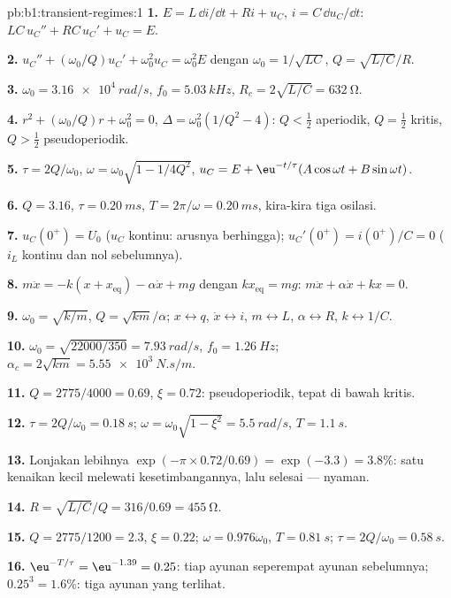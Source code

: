 \begin{solution}{pb:b1:transient-regimes:1}
\textbf{1.} $E = L\,\dd i/\dd t + Ri + u_C$, $i = C\,\dd u_C/\dd t$:
$LC\,u_C'' + RC\,u_C' + u_C = E$.

\textbf{2.} $u_C'' + (\omega_0/Q)u_C' + \omega_0^2u_C = \omega_0^2E$ dengan
$\omega_0 = 1/\sqrt{LC}$, $Q = \sqrt{L/C}/R$.

\textbf{3.} $\omega_0 = \qty{3.16e4}{rad/s}$, $f_0 = \qty{5.03}{kHz}$,
$R_c = 2\sqrt{L/C} = \qty{632}{\ohm}$.

\textbf{4.} $r^2 + (\omega_0/Q)r + \omega_0^2 = 0$, $\Delta = \omega_0^2(1/Q^2
- 4)$: $Q < \tfrac12$ aperiodik, $Q = \tfrac12$ kritis, $Q > \tfrac12$
pseudoperiodik.

\textbf{5.} $\tau = 2Q/\omega_0$, $\omega = \omega_0\sqrt{1 - 1/4Q^2}$,
$u_C = E + \eu^{-t/\tau}(A\cos\omega t + B\sin\omega t)$.

\textbf{6.} $Q = 3.16$, $\tau = \qty{0.20}{ms}$, $T = 2\pi/\omega =
\qty{0.20}{ms}$, kira-kira tiga osilasi.

\textbf{7.} $u_C(0^+) = U_0$ ($u_C$ kontinu: arusnya berhingga);
$u_C'(0^+) = i(0^+)/C = 0$ ($i_L$ kontinu dan nol sebelumnya).

\textbf{8.} $m\ddot x = -k(x + x_{\text{eq}}) - \alpha\dot x + mg$ dengan
$kx_{\text{eq}} = mg$: $m\ddot x + \alpha\dot x + kx = 0$.

\textbf{9.} $\omega_0 = \sqrt{k/m}$, $Q = \sqrt{km}/\alpha$; $x \leftrightarrow
q$, $\dot x \leftrightarrow i$, $m \leftrightarrow L$, $\alpha \leftrightarrow
R$, $k \leftrightarrow 1/C$.

\textbf{10.} $\omega_0 = \sqrt{22000/350} = \qty{7.93}{rad/s}$, $f_0 =
\qty{1.26}{Hz}$; $\alpha_c = 2\sqrt{km} = \qty{5.55e3}{N.s/m}$.

\textbf{11.} $Q = 2775/4000 = 0.69$, $\xi = 0.72$: pseudoperiodik, tepat
di bawah kritis.

\textbf{12.} $\tau = 2Q/\omega_0 = \qty{0.18}{s}$; $\omega = \omega_0\sqrt{1
- \xi^2} = \qty{5.5}{rad/s}$, $T = \qty{1.1}{s}$.

\textbf{13.} Lonjakan lebihnya $\exp(-\pi \times 0.72/0.69) = \exp(-3.3) = 3.8\%$:
satu kenaikan kecil melewati kesetimbangannya, lalu selesai --- nyaman.

\textbf{14.} $R = \sqrt{L/C}/Q = 316/0.69 = \qty{455}{\ohm}$.

\textbf{15.} $Q = 2775/1200 = 2.3$, $\xi = 0.22$; $\omega = 0.976\omega_0$,
$T = \qty{0.81}{s}$; $\tau = 2Q/\omega_0 = \qty{0.58}{s}$.

\textbf{16.} $\eu^{-T/\tau} = \eu^{-1.39} = 0.25$: tiap ayunan
seperempat ayunan sebelumnya; $0.25^3 = 1.6\%$: tiga ayunan yang terlihat.


\end{solution}
